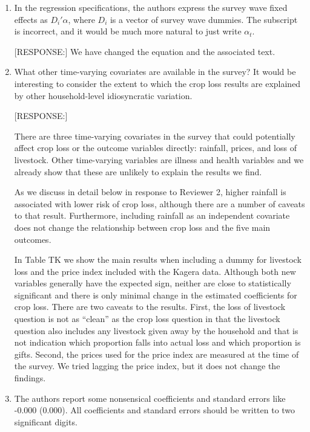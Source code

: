 \documentclass[letterpaper,12pt]{article}
\begin{document}
\begin{enumerate}
\item In the regression specifications, the authors express the survey
wave fixed effects as $D_{i}'\alpha$, where $D_{i}$ is a vector of survey
wave dummies. The subscript is incorrect, and it would be much more
natural to just write $\alpha_{t}$.

[RESPONSE:] We have changed the equation and the associated text.

\item What other time-varying covariates are available in the survey? It
would be interesting to consider the extent to which the crop loss
results are explained by other household-level idiosyncratic variation.

[RESPONSE:] 

There are three time-varying covariates in the survey that could 
potentially affect crop loss or the outcome variables directly:
rainfall, prices, and loss of livestock.
Other time-varying variables are illness and health variables and 
we already show that these are unlikely to explain the results we find.

As we discuss in detail below in response to Reviewer 2, higher 
rainfall is associated with lower risk of crop loss, although there
are a number of caveats to that result.
Furthermore, including rainfall as an independent covariate does 
not change the relationship between crop loss and the five main outcomes.

In Table TK we show the main results when including a dummy for livestock
loss and the price index included with the Kagera data.
Although both new variables generally have the expected sign, neither are 
close to statistically significant and there is only minimal change in the 
estimated coefficients for crop loss.
There are two caveats to the results.
First, the loss of livestock question is not as ``clean'' as the
crop loss question in that the livestock question also includes 
any livestock given away by the household and that is not indication which
proportion falls into actual loss and which proportion is gifts.
Second, the prices used for the price index are measured at the time
of the survey.
We tried lagging the price index, but it does not change the findings.



\item The authors report some nonsensical coefficients and standard
errors like -0.000 (0.000). All coefficients and standard errors should
be written to two significant digits.


\end{enumerate}
\end{document}
